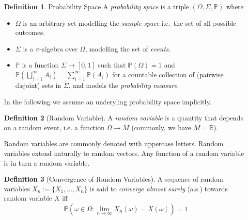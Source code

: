 \documentclass[10pt]{article}
\theoremstyle{definition}
\newtheorem{mydef}{Definition}[section]
\begin{document}
\begin{mydef}{Probability Space}
  A \emph{probability space} is a triple \((\Omega, \Sigma, \mathbb{P})\)
  where
  \begin{itemize}
  \item \(\Omega\) is an arbitrary set modelling the \emph{sample space}
    i.e.~the set of all possible outcomes.
  \item \(\Sigma\) is a \(\sigma\)-algebra
    over \(\Omega\), modelling the set of \emph{events}.
    \item \(\mathbb{P}\) is a function
    \(\Sigma \to [0,1]\) such that \(\mathbb{P}(\Omega)=1\) and
    \(\mathbb{P}\left( \bigcup_{i=1}^\infty A_{i} \right) = \sum_{i=1}^\infty
    \mathbb{P}(A_{i})\) for a countable collection of (pairwise disjoint) sets
    in \(\Sigma\), and models the \emph{probability measure}.
  \end{itemize}
\end{mydef}

In the following we assume an underyling probability space implicitly.




\begin{mydef}[Random Variable]
  A \textit{random variable} is a quantity
  that depends on a random event, i.e. a function \(\Omega
  \to M\) (commonly, we have \(M=\mathbb{R}\)).
\end{mydef}

Random variables are commonly denoted with uppercase letters. Random variables
extend naturally to random vectors. Any function of a random variable is in turn
a random variable. 

\begin{mydef}[Convergence of Random Variables]
  A sequence of random variables \(X_{n} := \{X_{1}, \dots, X_{n}\}\) is said to
  \emph{converge almost surely} (a.s.) towards random variable \(X\) iff \[
    \mathbb{P}\left(\omega \in \Omega: \lim _{n \rightarrow \infty}
      X_n(\omega)=X(\omega)\right)=1
  \]
\end{mydef}
\end{document}
